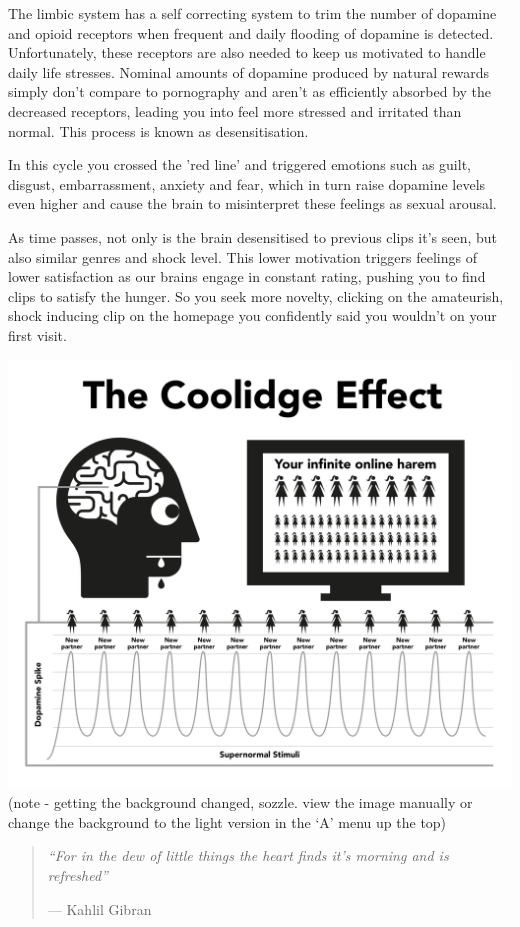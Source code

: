 \documentclass[
]{book}
\begin{document}
The limbic system has a self correcting system to trim the number of dopamine and opioid receptors when frequent and daily flooding of dopamine is detected. Unfortunately, these receptors are also needed to keep us motivated to handle daily life stresses. Nominal amounts of dopamine produced by natural rewards simply don't compare to pornography and aren't as efficiently absorbed by the decreased receptors, leading you into feel more stressed and irritated than normal. This process is known as desensitisation.

In this cycle you crossed the 'red line' and triggered emotions such as guilt, disgust, embarrassment, anxiety and fear, which in turn raise dopamine levels even higher and cause the brain to misinterpret these feelings as sexual arousal.

As time passes, not only is the brain desensitised to previous clips it's seen, but also similar genres and shock level. This lower motivation triggers feelings of lower satisfaction as our brains engage in constant rating, pushing you to find clips to satisfy the hunger. So you seek more novelty, clicking on the amateurish, shock inducing clip on the homepage you confidently said you wouldn't on your first visit.

\includegraphics{images/coolidge.png}
(note - getting the background changed, sozzle. view the image manually or change the background to the light version in the `A' menu up the top)

\begin{quote}
\emph{``For in the dew of little things the heart finds it's morning and is refreshed''}

--- Kahlil Gibran
\end{quote}
\end{document}
